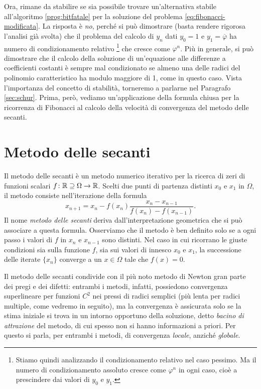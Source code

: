 Ora, rimane da stabilire se sia possibile trovare un'alternativa stabile
all'algoritmo \ref{prog:bitfatale} per la soluzione del problema
\ref{eq:fibonacci-modificata}. La risposta è \emph{no}, perché si può dimostrare
(basta rendere rigorosa l'analisi già svolta) che il problema del calcolo
di $y_n$ dati $y_0 = 1$ e $y_1 = \overline{\varphi}$ ha numero di
condizionamento relativo%
\footnote{Stiamo quindi analizzando il condizionamento relativo nel caso pessimo.
Ma il numero di condizionamento assoluto cresce come $\varphi^n$ in ogni caso,
cioè a prescindere dai valori di $y_0$ e $y_1$.}
che cresce come $\varphi^n$.
Più in generale, si può dimostrare che il calcolo della soluzione di un'equazione
alle differenze a coefficienti costanti è sempre mal condizionato se
almeno una delle radici del polinomio caratteristico ha modulo
maggiore di 1, come in questo caso.
Vista l'importanza del concetto di stabilità, torneremo a parlarne
nel Paragrafo \ref{sec:schur}.
Prima, però, vediamo un'applicazione della formula chiusa
per la ricorrenza di Fibonacci al calcolo della velocità di convergenza
del metodo delle secanti.

\section{Metodo delle secanti} \label{sec:secanti}

Il metodo delle secanti è un metodo numerico iterativo per la ricerca
di zeri di funzioni scalari $f \colon \mathbb{R} \supseteq \Omega \to \mathbb{R}$.
Scelti due punti di partenza distinti $x_0$ e $x_1$
in $\Omega$, il metodo consiste nell'iterazione della formula
\begin{equation} \label{eq:definizione-secanti}
x_{n+1} = x_n - f(x_n) \frac{x_n-x_{n-1}}{f(x_n)-f(x_{n-1})}.
\end{equation}
Il nome \emph{metodo delle secanti} deriva dall'interpretazione
geometrica che si può associare a questa formula.
Osserviamo che il metodo è ben definito solo se a ogni passo
i valori di $f$ in $x_n$ e $x_{n-1}$ sono distinti.
Nel caso in cui ricorrano le giuste condizioni sia sulla funzione $f$,
sia sui valori di innesco $x_0$ e $x_1$, la
successione delle iterate $\{x_n\}$ converge a un
$x \in \Omega$ tale che $f(x) = 0$.

Il metodo delle secanti condivide con il più noto metodo di Newton
gran parte dei pregi e dei difetti: entrambi i metodi, infatti,
possiedono convergenza superlineare per funzioni $C^2$ nei pressi
di radici semplici (più lenta per radici multiple, come vedremo in seguito),
ma la convergenza è assicurata solo se la stima iniziale si trova
in un intorno opportuno della soluzione, detto \emph{bacino di attrazione} del metodo,
di cui spesso non si hanno informazioni a priori.
Per questo si parla, per entrambi i metodi, di convergenza \emph{locale},
anziché \emph{globale}.

